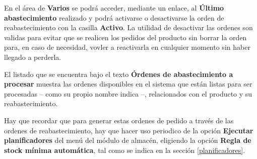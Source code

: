 En el área de \textbf{Varios} se podrá acceder, mediante un enlace, al \textbf{Último abastecimiento} realizado y podrá activarse o desactivarse la orden de reabastecimiento con la casilla \textbf{Activo}. La utilidad de desactivar las ordenes son validas para evitar que se realicen los pedidos del producto sin borrar la orden para, en caso de necesidad, vovler a reactivarla en cualquier momento sin haber llegado a perderla.

El listado que se encuentra bajo el texto \textbf{Órdenes de abastecimiento a procesar} muestra las ordenes disponibles en el sistema que están listas para ser procesadas -- como su propio nombre indica --, relacionados con el producto y su reabastecimiento.

Hay que recordar que para generar estas ordenes de pedido a través de las ordenes de reabastecimiento, hay que hacer uso periodico de la opción \textbf{Ejecutar planificadores} del menú del módulo de almacén, eligiendo la opción \textbf{Regla de stock mínima automática}, tal como se indica en la sección \ref{planificadores}.
